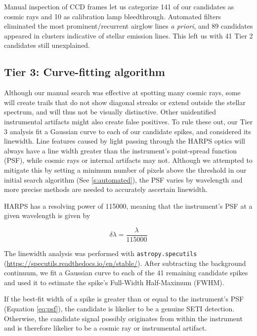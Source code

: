 \documentclass[twocolumn]{aastex701}
\begin{document}
Manual inspection of CCD frames let us categorize 141 of our candidates as cosmic rays and 10 as calibration lamp bleedthrough. Automated filters eliminated the most prominent/recurrent airglow lines {\em a priori}, and 89 candidates appeared in clusters indicative of stellar emission lines. This left us with 41 Tier 2 candidates still unexplained.

\subsection{Tier 3: Curve-fitting algorithm}
\label{s:curvefit}

Although our manual search was effective at spotting many cosmic rays, some will create trails that do not show diagonal streaks or extend outside the stellar spectrum, and will thus not be visually distinctive.  Other unidentified instrumental artifacts might also create false positives.  To rule these out, our Tier 3 analysis fit a Gaussian curve to each of our candidate spikes, and considered its linewidth.  Line features caused by light passing through the HARPS optics will always have a line width greater than the instrument's point-spread function (PSF), while cosmic rays or internal artifacts may not. Although we attempted to mitigate this by setting a minimum number of pixels above the threshold in our initial search algorithm (See \ref{s:automated}), the PSF varies by wavelength and more precise methods are needed to accurately ascertain linewidth.

HARPS has a resolving power \citep{HARPS_specs} of 115000, meaning that the instrument's PSF at a given wavelength is given by 

\begin{equation}
    \delta\lambda = \frac{\lambda}{115000}
    \label{eq:psf}
\end{equation}

The linewidth analysis was performed with \texttt{astropy.specutils} (\url{https://specutils.readthedocs.io/en/stable/}). After subtracting the background continuum, we fit a Gaussian curve to each of the 41 remaining candidate spikes and used it to estimate the spike's Full-Width Half-Maximum (FWHM).

If the best-fit width of a spike is greater than or equal to the instrument's PSF (Equation \ref{eq:psf}), the candidate is likelier to be a genuine SETI detection. Otherwise, the candidate signal possibly originates from within the instrument and is therefore likelier to be a cosmic ray or instrumental artifact.
\end{document}
